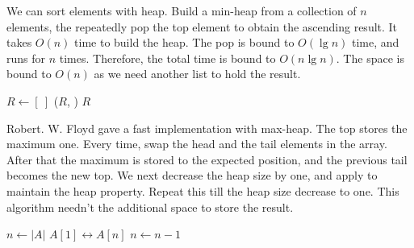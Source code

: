 \documentclass[b5paper]{article}
\begin{document}
We can sort elements with heap. Build a min-heap from a collection of $n$ elements, the repeatedly pop the top element to obtain the ascending result. It takes $O(n)$ time to build the heap. The pop is bound to $O(\lg n)$ time, and runs for $n$ times. Therefore, the total time is bound to $O(n \lg n)$. The space is bound to $O(n)$ as we need another list to hold the result.

\begin{algorithmic}[1]
  \State $R \gets [\ ]$
  \State {}
    \State {}($R$, )
  \EndWhile
  \State \Return $R$
\EndFunction
\end{algorithmic}

Robert. W. Floyd gave a fast implementation with max-heap. The top stores the maximum one. Every time, swap the head and the tail elements in the array. After that the maximum is stored to the expected position, and the previous tail becomes the new top. We next decrease the heap size by one, and apply  to maintain the heap property. Repeat this till the heap size decrease to one. This algorithm needn't the additional space to store the result.

\begin{algorithmic}[1]
  \State {}
  \State $n \gets |A|$
    \State {} $A[1] \leftrightarrow A[n]$
    \State $n \gets n - 1$
    \State {}
  \EndWhile
\EndFunction
\end{algorithmic}

\begin{Exercise}\label{ex:arrayed-binary-heap}

\end{Exercise}
\end{document}
